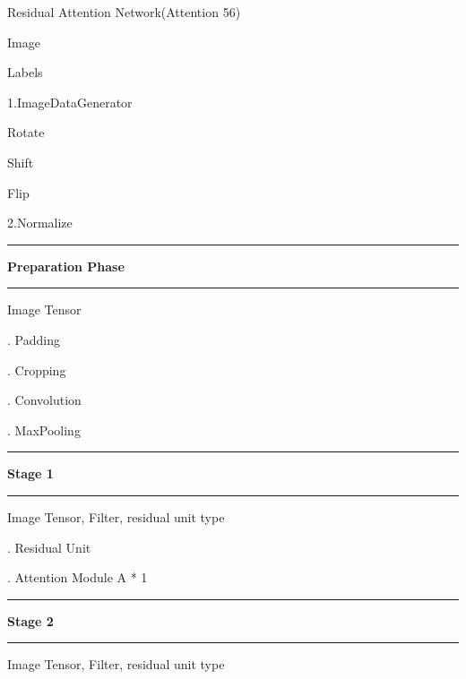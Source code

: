 \documentclass{article}
\newcommand\Algphase[1]{%

\vspace*{-.7\baselineskip}\Statex\hspace*{\dimexpr-\algorithmicindent-2pt\relax}\rule{\textwidth}{0.4pt}%

\Statex\hspace*{-\algorithmicindent}\textbf{#1}%

\vspace*{-.7\baselineskip}\Statex\hspace*{\dimexpr-\algorithmicindent-2pt\relax}\rule{\textwidth}{0.4pt}%

}
\begin{document}
\renewcommand{\algorithmicrequire}{\textbf{Input:}}

\renewcommand{\algorithmicensure}{\textbf{Output:}}
\renewcommand{\algorithmicprocedure}{ \textbf{Processing:}}


\begin{algorithm}

\caption{Residual Attention Network(Attention 56)}\label{euclid}

\begin{algorithmic}

\Require Image

\Ensure Labels

\Procedure{}{}

\State 1.ImageDataGenerator

\State {} Rotate

\State {} Shift

\State {} Flip

\State 2.Normalize

\EndProcedure%

\Algphase{Preparation Phase}

\Require Image Tensor    

\Procedure{}{} 

. Padding  

. Cropping  

. Convolution  

. MaxPooling  

\EndProcedure\qquad\qquad\qquad\qquad\qquad\qquad\qquad\qquad\qquad

\Algphase{Stage 1}

\Require Image Tensor, Filter, residual unit type 

\Procedure{}{} 

. Residual Unit 

. Attention Module A * 1  

\EndProcedure\qquad\qquad\qquad\qquad\qquad\qquad\qquad\qquad\qquad{}

\Algphase{Stage 2}

\Require Image Tensor, Filter, residual unit type  

\Procedure{}{} 


\end{algorithmic}
\end{algorithm}
\end{document}
